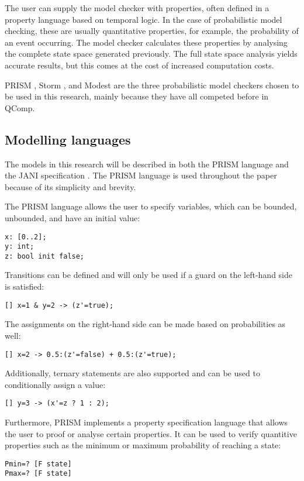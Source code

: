 The user can supply the model checker with properties, often defined in a property language based on temporal logic. In the case of probabilistic model checking, these are usually quantitative properties, for example, the probability of an event occurring. The model checker calculates these properties by analysing the complete state space generated previously. The full state space analysis yields accurate results, but this comes at the cost of increased computation costs.

PRISM \cite{KNP11}, Storm \cite{Hensel2020}, and Modest \cite{HartmannsH14} are the three probabilistic model checkers chosen to be used in this research, mainly because they have all competed before in QComp.

\subsection{Modelling languages}
The models in this research will be described in both the PRISM language \cite{KNP11} and the JANI specification \cite{Budde2017}. The PRISM language is used throughout the paper because of its simplicity and brevity. 

The PRISM language allows the user to specify variables, which can be bounded, unbounded, and have an initial value:
\begin{lstlisting}[language=PRISM]
x: [0..2];
y: int;
z: bool init false;
\end{lstlisting}
Transitions can be defined and will only be used if a guard on the left-hand side is satisfied:
\begin{lstlisting}[language=PRISM]
[] x=1 & y=2 -> (z'=true);
\end{lstlisting}
The assignments on the right-hand side can be made based on probabilities as well:
\begin{lstlisting}[language=PRISM]
[] x=2 -> 0.5:(z'=false) + 0.5:(z'=true);
\end{lstlisting}
Additionally, ternary statements are also supported and can be used to conditionally assign a value:
\begin{lstlisting}[language=PRISM]
[] y=3 -> (x'=z ? 1 : 2);
\end{lstlisting}

Furthermore, PRISM implements a property specification language that allows the user to proof or analyse certain properties. It can be used to verify quantitive properties such as the minimum or maximum probability of reaching a state:
\begin{lstlisting}[language=PRISM]
Pmin=? [F state]
Pmax=? [F state]
\end{lstlisting}

